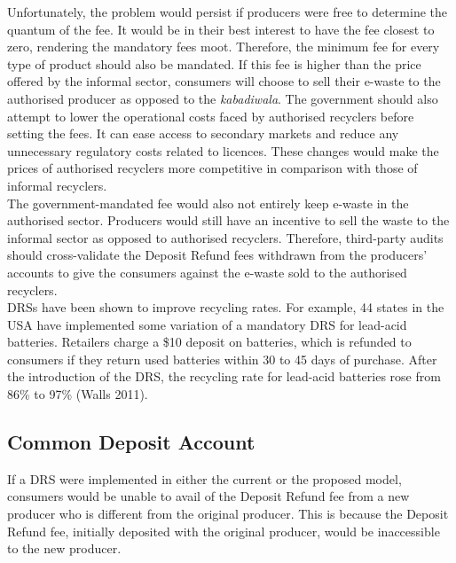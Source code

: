 \documentclass[a4paper, 12pt]{article}
\begin{document}
                      Unfortunately, the problem would persist if producers were free to determine the quantum of the fee. It would be in their best interest to have the fee closest to zero, rendering the mandatory fees moot. Therefore, the minimum fee for every type of product should also be mandated. If this fee is higher than the price offered by the informal sector, consumers will choose to sell their e-waste to the authorised producer as opposed to the \textit{kabadiwala}. The government should also attempt to lower the operational costs faced by authorised recyclers before setting the fees. It can ease access to secondary markets and reduce any unnecessary regulatory costs related to licences. These changes would make the prices of authorised recyclers more competitive in comparison with those of informal recyclers.\\
                    
                    The government-mandated fee would also not entirely keep e-waste in the authorised sector. Producers would still have an incentive to sell the waste to the informal sector as opposed to authorised recyclers. Therefore, third-party audits should cross-validate the Deposit Refund fees withdrawn from the producers’ accounts to give the consumers against the e-waste sold to the authorised recyclers.\\ 
                    
                    DRSs have been shown to improve recycling rates. For example, 44 states in the USA have implemented some variation of a mandatory DRS for lead-acid batteries. Retailers charge a \$10 deposit on batteries, which is refunded to consumers if they return used batteries within 30 to 45 days of purchase. After the introduction of the DRS, the recycling rate for lead-acid batteries rose from 86\% to 97\% (Walls 2011).\\
                    
                    \subsection{Common Deposit Account}
                    
                    If a DRS were implemented in either the current or the proposed model, consumers would be unable to avail of the Deposit Refund fee from a new producer who is different from the original producer. This is because the Deposit Refund fee, initially deposited with the original producer, would be inaccessible to the new producer.\\ 
                    
\end{document}
